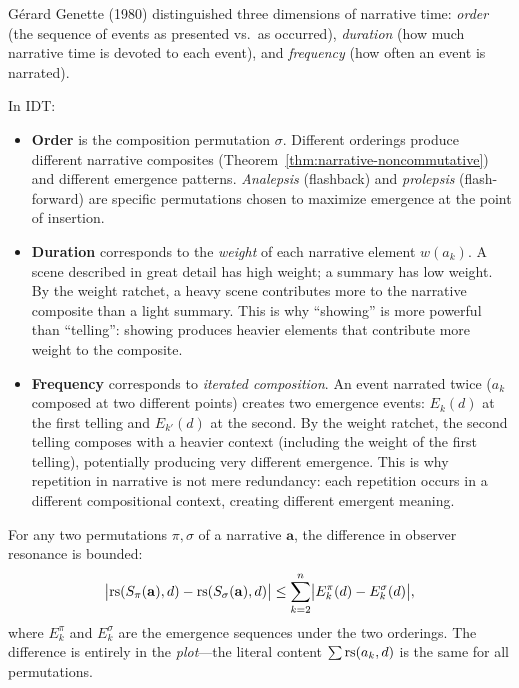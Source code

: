 \begin{remark}
\label{rem:genette}
Gérard Genette (1980) distinguished three dimensions of narrative time:
\emph{order} (the sequence of events as presented vs.\ as occurred),
\emph{duration} (how much narrative time is devoted to each event), and
\emph{frequency} (how often an event is narrated).

In IDT:
\begin{itemize}
  \item \textbf{Order} is the composition permutation $\sigma$.  Different
        orderings produce different narrative composites
        (Theorem~\ref{thm:narrative-noncommutative}) and different emergence
        patterns.  \emph{Analepsis} (flashback) and \emph{prolepsis}
        (flash-forward) are specific permutations chosen to maximize
        emergence at the point of insertion.

  \item \textbf{Duration} corresponds to the \emph{weight} of each narrative
        element $w(a_k)$.  A scene described in great detail has high weight;
        a summary has low weight.  By the weight ratchet, a heavy scene
        contributes more to the narrative composite than a light summary.
        This is why ``showing'' is more powerful than ``telling'': showing
        produces heavier elements that contribute more weight to the composite.

  \item \textbf{Frequency} corresponds to \emph{iterated composition}.
        An event narrated twice ($a_k$ composed at two different points)
        creates two emergence events: $E_k(d)$ at the first telling and
        $E_{k'}(d)$ at the second.  By the weight ratchet, the second
        telling composes with a heavier context (including the weight of
        the first telling), potentially producing very different emergence.
        This is why repetition in narrative is not mere redundancy: each
        repetition occurs in a different compositional context, creating
        different emergent meaning.
\end{itemize}
\end{remark}

\begin{theorem}
\label{thm:reordering-bound}
For any two permutations $\pi, \sigma$ of a narrative $\mathbf{a}$, the
difference in observer resonance is bounded:
\[
  \bigl|\mathrm{rs}(S_\pi(\mathbf{a}), d) - \mathrm{rs}(S_\sigma(\mathbf{a}), d)\bigr|
  \leq \sum_{k=2}^{n} \bigl|E_k^\pi(d) - E_k^\sigma(d)\bigr|,
\]
where $E_k^\pi$ and $E_k^\sigma$ are the emergence sequences under the
two orderings.  The difference is entirely in the \emph{plot}---the literal
content $\sum \mathrm{rs}(a_k, d)$ is the same for all permutations.
\end{theorem}

